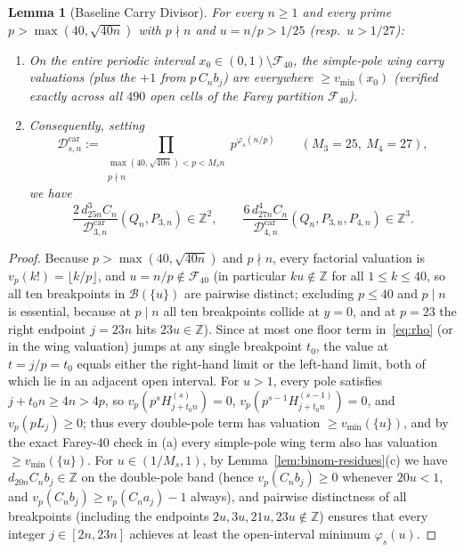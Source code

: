 \documentclass[11pt,reqno]{amsart}
\newtheorem{lemma}[theorem]{Lemma}
\theoremstyle{definition}
\theoremstyle{remark}
\newcommand{\ZZ}{\mathbb{Z}}
\begin{document}
\begin{lemma}[Baseline Carry Divisor]
\label{lem:carry}
For every $n \ge 1$ and every prime $p > \max(40, \sqrt{40n})$ with $p \nmid n$ and $u = n/p > 1/25$ (resp.\ $u > 1/27$):
\begin{enumerate}
  \item[\emph{(a)}] On the entire periodic interval $x_0 \in (0, 1) \setminus \mathcal{F}_{40}$, the simple-pole wing carry valuations (plus the $+1$ from $p\,C_n b_j$) are everywhere $\ge v_{\min}(x_0)$ (verified exactly across all $490$ open cells of the Farey partition $\mathcal{F}_{40}$).
  \item[\emph{(b)}] Consequently, setting
  \[
    \mathcal{D}_{s,n}^{\mathrm{car}} := \prod_{\substack{\max(40, \sqrt{40n}) < p < M_s n \\ p \nmid n}} p^{\varphi_s(n/p)}
    \qquad (M_3 = 25,\ M_4 = 27),
  \]
  we have
  \[
    \frac{2\, d_{25n}^3 C_n}{\mathcal{D}_{3,n}^{\mathrm{car}}}(Q_n, P_{3,n}) \in \ZZ^2,
    \qquad
    \frac{6\, d_{27n}^4 C_n}{\mathcal{D}_{4,n}^{\mathrm{car}}}(Q_n, P_{3,n}, P_{4,n}) \in \ZZ^3.
  \]
\end{enumerate}
\end{lemma}

\begin{proof}
Because $p > \max(40, \sqrt{40n})$ and $p \nmid n$, every factorial valuation is $v_p(k!) = \lfloor k/p \rfloor$, and $u = n/p \notin \mathcal{F}_{40}$ (in particular $k u \notin \ZZ$ for all $1 \le k \le 40$, so all ten breakpoints in $\mathcal{B}(\{u\})$ are pairwise distinct; excluding $p \le 40$ and $p \mid n$ is essential, because at $p \mid n$ all ten breakpoints collide at $y = 0$, and at $p = 23$ the right endpoint $j = 23n$ hits $23u \in \ZZ$). Since at most one floor term in~\eqref{eq:rho} (or in the wing valuation) jumps at any single breakpoint $t_0$, the value at $t = j/p = t_0$ equals either the right-hand limit or the left-hand limit, both of which lie in an adjacent open interval. For $u > 1$, every pole satisfies $j + t_0 n \ge 4n > 4p$, so $v_p(p^s H_{j+t_0 n}^{(s)}) = 0$, $v_p(p^{s-1} H_{j+t_0 n}^{(s-1)}) = 0$, and $v_p(p L_j) \ge 0$; thus every double-pole term has valuation $\ge v_{\min}(\{u\})$, and by the exact Farey-$40$ check in (a) every simple-pole wing term also has valuation $\ge v_{\min}(\{u\})$. For $u \in (1/M_s, 1)$, by Lemma~\ref{lem:binom-residues}(c) we have $d_{20n} C_n b_j \in \ZZ$ on the double-pole band (hence $v_p(C_n b_j) \ge 0$ whenever $20u < 1$, and $v_p(C_n b_j) \ge v_p(C_n a_j) - 1$ always), and pairwise distinctness of all breakpoints (including the endpoints $2u, 3u, 21u, 23u \notin \ZZ$) ensures that every integer $j \in [2n, 23n]$ achieves at least the open-interval minimum $\varphi_s(u)$.
\end{proof}
\end{document}
